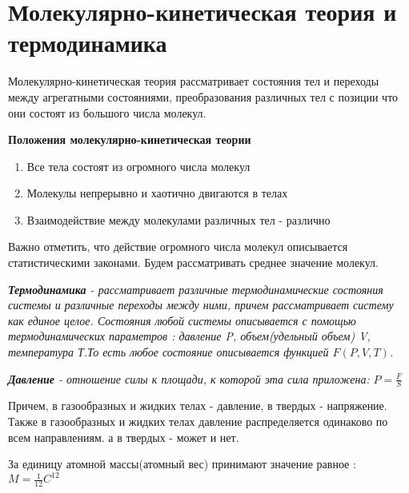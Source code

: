 \documentclass[../main.tex]{subfiles}
\begin{document}
\chapter{Молекулярно-кинетическая теория и термодинамика}

Молекулярно-кинетическая теория рассматривает состояния тел и переходы между агрегатными состояниями, преобразования различных тел с позиции что они состоят из большого числа молекул.

\vspace{5px}

\textbf{Положения молекулярно-кинетическая теории}
\begin{enumerate}
    \item Все тела состоят из огромного числа молекул
    \item Молекулы непрерывно и хаотично двигаются в телах
    \item Взаимодействие между молекулами различных тел - различно
\end{enumerate}
Важно отметить, что действие огромного числа молекул описывается статистическими законами. Будем рассматривать среднее значение молекул.

\vspace{5px}

 \textit{\textbf{Термодинамика} - рассматривает различные термодинамические состояния системы и различные переходы между ними, причем рассматривает систему как единое целое. Состояния любой системы описывается с помощью термодинамических параметров : давление P, объем(удельный объем) V, температура Т.То есть любое состояние описывается функцией $F(P, V, T)$. }

\vspace{5px}

 \textit{\textbf{Давление} - отношение силы к площади, к которой эта сила приложена:} $P = \frac{F}{S}$

\vspace{5px}

Причем, в газообразных и жидких телах - давление, в твердых - напряжение. Также в газообразных и жидких телах давление распределяется одинаково по всем направлениям. а в твердых - может и нет.

\vspace{5px}

За единицу атомной массы(атомный вес) принимают значение равное : $ M = \frac{1}{12}C^{12}$

\vspace{5px}
\end{document}
